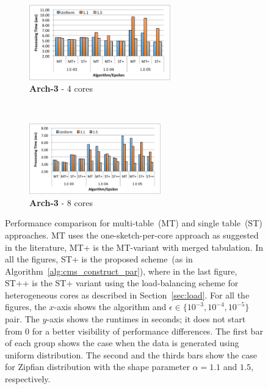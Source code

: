\documentclass[runningheads]{llncs}
\begin{document}
\begin{figure}[htbp]
    \begin{subfigure}[b]{0.47\textwidth}
        \centering
        \includegraphics[width = 6.1cm]{main_3_4.pdf}
        \caption{{\bf Arch-3} - 4 cores}
    \end{subfigure}\hspace*{1ex}
    ~
    \begin{subfigure}[b]{0.47\textwidth}
        \centering
        \includegraphics[width = 5.7cm]{main_3_8.pdf}
        \caption{{\bf Arch-3} - 8 cores}
    \end{subfigure}
     \renewcommand{\baselinestretch}{0.93}
    \caption{\small{Performance comparison for multi-table~(MT) and single table~(ST) approaches. MT uses the one-sketch-per-core approach as suggested in the literature, MT+ is the MT-variant with merged tabulation. In all the figures, ST+ is the proposed scheme~(as in Algorithm~\ref{alg:cms_construct_par}), where in the last figure, ST++ is the ST+ variant using the  load-balancing scheme for heterogeneous cores as described in Section~\ref{sec:load}. For all the figures, the $x$-axis shows the algorithm and $\epsilon \in \{10^{-3}, 10^{-4}, 10^{-5}\}$ pair. The $y$-axis shows the runtimes in seconds; it does not start from 0 for a better visibility of performance differences. The first bar of each group shows the case when the data is generated using uniform distribution. The second and the thirds bars show the case for Zipfian distribution with the shape parameter $\alpha = 1.1$ and $1.5$, respectively.}}
     \renewcommand{\baselinestretch}{1}

    \label{fig:main}
\end{figure}
\end{document}

